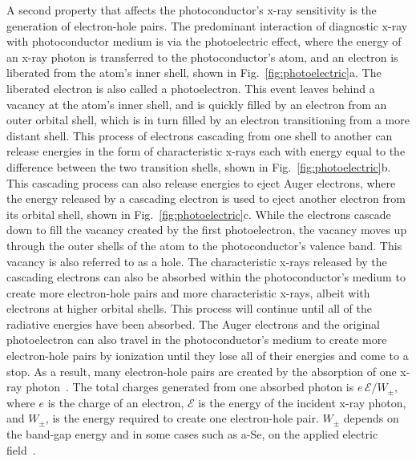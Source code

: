 A second property that affects the photoconductor's x-ray sensitivity is the generation of electron-hole pairs.  The predominant interaction of diagnostic x-ray with photoconductor medium is via the photoelectric effect, where the energy of an x-ray photon is transferred to the photoconductor's atom, and an electron is liberated from the atom's inner shell, shown in Fig.~\ref{fig:photoelectric}a.  The liberated electron is also called a photoelectron.  This event leaves behind a vacancy at the atom's inner shell, and is quickly filled by an electron from an outer orbital shell, which is in turn filled by an electron transitioning from a more distant shell.  This process of electrons cascading from one shell to another can release energies in the form of characteristic x-rays each with energy equal to the difference between the two transition shells, shown in Fig.~\ref{fig:photoelectric}b.  This cascading process can also release energies to eject Auger electrons, where the energy released by a cascading electron is used to eject another electron from its orbital shell, shown in Fig.~\ref{fig:photoelectric}c.  While the electrons cascade down to fill the vacancy created by the first photoelectron, the vacancy moves up through the outer shells of the atom to the photoconductor's valence band.  This vacancy is also referred to as a hole.  The characteristic x-rays released by the cascading electrons can also be absorbed within the photoconductor's medium to create more electron-hole pairs and more characteristic x-rays, albeit with electrons at higher orbital shells.  This process will continue until all of the radiative energies have been absorbed.  The Auger electrons and the original photoelectron can also travel in the photoconductor's medium to create more electron-hole pairs by ionization until they lose all of their energies and come to a stop.  As a result, many electron-hole pairs are created by the absorption of one x-ray photon~\citep{Bushberg2002, Hajdok2006}.  The total charges generated from one absorbed photon is $e \, \mathcal{E} / W_{\pm}$, where $e$ is the charge of an electron, $\mathcal{E}$ is the energy of the incident x-ray photon, and $W_{\pm}$, is the energy required to create one electron-hole pair.  $W_{\pm}$ depends on the band-gap energy and in some cases such as a-Se, on the applied electric field~\citep{kasap2006}.
    

